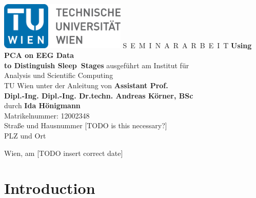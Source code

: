 \documentclass[a4paper,11pt,bibliography=totoc,listof=totoc,headinclude=true,cleardoublepage=empty,oneside]{scrbook}
\begin{document}


\begin{titlepage}
  \begin{center}
    \includegraphics[width=0.45\textwidth]{TULogo.eps}
    \vskip 1cm%
    {\LARGE S~\Large E~M~I~N~A~R~A~R~B~E~I~T}
    \vskip 8mm
    {\huge\bfseries\color{change}Using PCA on EEG Data \\[1ex] to Distinguish Sleep~Stages}
    \vskip 1cm
    \large 
    ausgef\"uhrt am    
    \vskip 0.75cm
    {\Large Institut f\"ur\\[1ex] Analysis und Scientific Computing}\\[1ex]
    {\Large TU Wien}
    \vskip0.75cm
    unter der Anleitung von
    \vskip0.75cm
    {\Large\bfseries\color{change}Assistant Prof. \\[1ex] Dipl.-Ing. Dipl.-Ing. Dr.techn. Andreas Körner, BSc}\\[1ex]
    \vskip 0.5cm
    durch
    \vskip 0.5cm
    {\Large\bfseries\color{change}Ida Hönigmann}\\[1ex]
    Matrikelnummer: {\color{change}12002348}\\[1ex]
    {\color{change}Straße und Hausnummer [TODO is this necessary?]}\\[1ex]
    {\color{change}PLZ und Ort}
  \end{center}
  
  \vfill
  
  \small
  Wien, am {\color{change} [TODO insert correct date]}
  \vspace*{-15mm}
\end{titlepage}

\cleardoublepage



\tableofcontents

\cleardoublepage
{} 


\chapter{Introduction}
\label{chapter:introduction}

\end{document}

